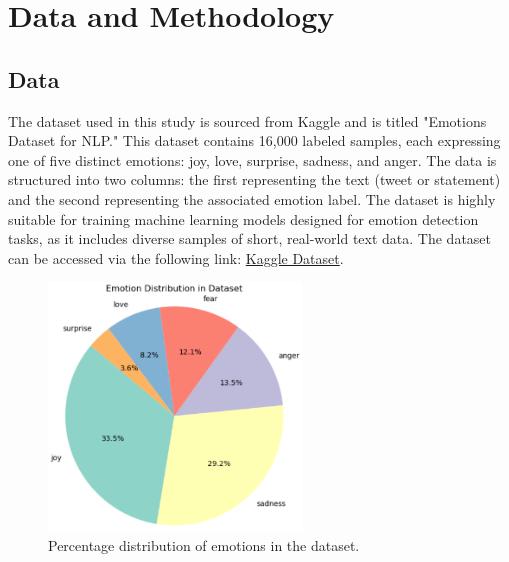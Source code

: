 

\section{Data and Methodology}

\subsection{Data}
The dataset used in this study is sourced from Kaggle and is titled "Emotions Dataset for NLP." This dataset contains 16,000 labeled samples, each expressing one of five distinct emotions: joy, love, surprise, sadness, and anger. The data is structured into two columns: the first representing the text (tweet or statement) and the second representing the associated emotion label. The dataset is highly suitable for training machine learning models designed for emotion detection tasks, as it includes diverse samples of short, real-world text data. The dataset can be accessed via the following link: \href{https://www.kaggle.com/datasets/praveengovi/emotions-dataset-for-nlp/data}{\color{blue}Kaggle Dataset}.

\begin{figure}[H]
    \centering
    \includegraphics[width=0.6\textwidth]{emotion_pie.png}
    \caption{Percentage distribution of emotions in the dataset.}
    \label{fig:emotion_pie}
\end{figure}

